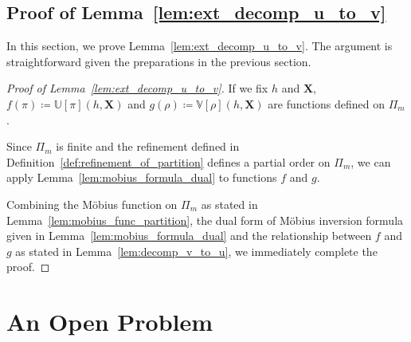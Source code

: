 \documentclass[sn-mathphys, natbib=false]{sn-jnl}
\theoremstyle{plain}
\theoremstyle{definition}
\newcommand{\mobius}{M\"obius}
\newcommand{\sPi}{\pi}
\newcommand{\ustat}{\mathbb{U}}
\newcommand{\vstat}{\mathbb{V}}
\newcommand{\partition}{\Pi}
\newcommand{\partitionp}[1]{\partition_{#1}}
\begin{document}
\begin{bibunit}[agsm]
\subsection{Proof of Lemma~\ref{lem:ext_decomp_u_to_v}}
\label{app:proof_ext_decomp_u_to_v}

In this section, we prove Lemma~\ref{lem:ext_decomp_u_to_v}. The argument is straightforward given the preparations in the previous section.

\begin{proof}[Proof of Lemma~\ref{lem:ext_decomp_u_to_v}]
If we fix $h$ and $\bm{X}$, $f(\sPi) \coloneqq \ustat[\sPi](h,\bm{X})$ and $g(\rho) \coloneqq \vstat[\rho](h,\bm{X})$ are functions defined on $\partitionp{m}$. 

Since $\partitionp{m}$ is finite and the refinement defined in Definition~\ref{def:refinement_of_partition} defines a partial order on $\partitionp{m}$, we can apply Lemma~\ref{lem:mobius_formula_dual} to functions $f$ and $g$. 

Combining the \mobius{} function on $\partitionp{m}$ as stated in Lemma~\ref{lem:mobius_func_partition}, the dual form of \mobius{} inversion formula given in Lemma~\ref{lem:mobius_formula_dual} and the relationship between $f$ and $g$ as stated in Lemma~\ref{lem:decomp_v_to_u}, we immediately complete the proof. 
\end{proof}


\section{An Open Problem}
\label{app:open}


\end{bibunit}
\end{document}
